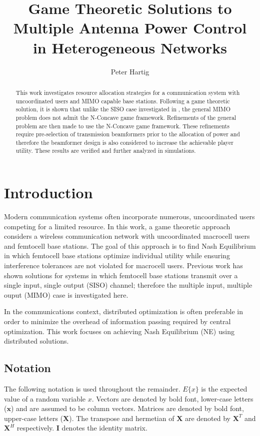 \documentclass[12pt,a4paper]{report}
\title{Game Theoretic Solutions to Multiple Antenna Power Control in Heterogeneous Networks}
\author{Peter Hartig}
\begin{document}
\maketitle
\begin{abstract}
This work investigates resource allocation strategies for a communication system with uncoordinated users and MIMO capable base stations. Following a game theoretic solution, it is shown that unlike the SISO case investigated in \cite{ghosh2015normalized}, the general MIMO problem does not admit the N-Concave game framework. Refinements of the general problem are then made to use the N-Concave game framework. These refinements require pre-selection of transmission beamformers prior to the allocation of power and therefore the beamformer design is also considered to increase the achievable player utility. These results are verified and further analyzed in simulations.
\end{abstract}
%
\tableofcontents


\chapter{Introduction}
Modern communication systems often incorporate numerous, uncoordinated users competing for a limited resource. In this work, a game theoretic approach considers a wireless communication network with uncoordinated macrocell users and femtocell base stations. The goal of this approach is to find Nash Equilibrium in which femtocell base stations optimize individual utility while ensuring interference tolerances are not violated for macrocell users. 
Previous work has shown solutions for systems in which femtocell base stations transmit over a single input, single output (SISO) channel; therefore the multiple input, multiple ouput (MIMO) case is investigated here. 
\par
In the communications context, distributed optimization is often preferable in order to minimize the overhead of information passing required by central optimization. 
This work focuses on achieving Nash Equilibrium (NE) using distributed solutions. 


\section{Notation}
The following notation is used throughout the remainder. 
$E\{x\}$ is the expected value of a random variable $x$.
Vectors are denoted by bold font, lower-case letters ($\mathbf{x}$) and are assumed to be column vectors.
Matrices are denoted by bold font, upper-case letters ($\mathbf{X}$). The transpose and hermetian of $\mathbf{X}$ are denoted by $\mathbf{X}^T$ and $\mathbf{X}^H$ respectively.
$\mathbf{I}$ denotes the identity matrix.
\end{document}
